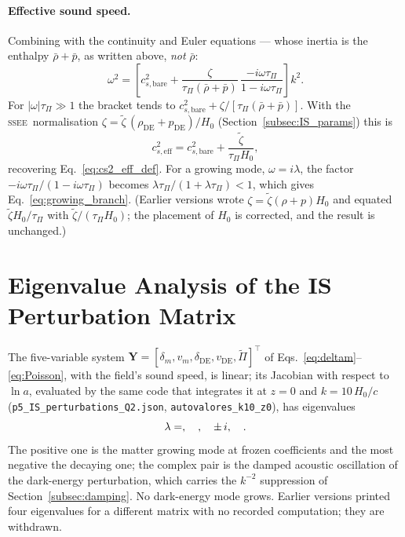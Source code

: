 \documentclass[12pt,a4paper]{article}
\newcommand{\SSEE}{\ifmmode\mathrm{SSEE}\else\textsc{ssee}\fi}
\newcommand{\tauPi}{\tau_\Pi}
\newcommand{\ztilde}{\tilde{\zeta}}
\newcommand{\Pitilde}{\tilde{\Pi}}
\begin{document}
\paragraph{Effective sound speed.}
Combining with the continuity and Euler equations --- whose inertia is the enthalpy
$\bar\rho+\bar p$, as written above, \emph{not} $\bar\rho$:
\begin{equation}
  \omega^2 = \left[c^2_{s,\mathrm{bare}}
    + \frac{\zeta}{\tauPi(\bar\rho+\bar p)}\,\frac{-i\omega\tauPi}{1-i\omega\tauPi}\right]k^2 .
\end{equation}
For $|\omega|\tauPi \gg 1$ the bracket tends to
$c^2_{s,\mathrm{bare}} + \zeta/[\tauPi(\bar\rho+\bar p)]$. With the \SSEE\ normalisation
$\zeta = \ztilde\,(\rho_{\mathrm{DE}}+p_{\mathrm{DE}})/H_0$
(Section~\ref{subsec:IS_params}) this is
\begin{equation}
  c^2_{s,\mathrm{eff}} = c^2_{s,\mathrm{bare}} + \frac{\ztilde}{\tauPi H_0},
\end{equation}
recovering Eq.~\eqref{eq:cs2_eff_def}. For a growing mode, $\omega=i\lambda$, the
factor $-i\omega\tauPi/(1-i\omega\tauPi)$ becomes $\lambda\tauPi/(1+\lambda\tauPi)<1$,
which gives Eq.~\eqref{eq:growing_branch}. (Earlier versions wrote
$\zeta=\ztilde(\rho+p)H_0$ and equated $\ztilde H_0/\tauPi$ with $\ztilde/(\tauPi H_0)$;
the placement of $H_0$ is corrected, and the result is unchanged.)

\section{Eigenvalue Analysis of the IS Perturbation Matrix}
\label{app:eigenvalues}

The five-variable system $\mathbf{Y} = [\delta_m, v_m, \delta_{\mathrm{DE}},
v_{\mathrm{DE}}, \Pitilde]^\top$ of Eqs.~\eqref{eq:deltam}--\eqref{eq:Poisson}, with the
field's sound speed, is linear; its Jacobian with respect to $\ln a$, evaluated by the
same code that integrates it at $z=0$ and $k=10\,H_0/c$
(\texttt{p5\_IS\_perturbations\_Q2.json}, \texttt{autovalores\_k10\_z0}), has
eigenvalues
\begin{equation}
  \lambda = \val{p5_eig0},\quad \val{p5_eig1},\quad
  \val{p5_eig2}\pm\val{p5_eig_im}\,i,\quad \val{p5_eig4}.
\end{equation}
The positive one is the matter growing mode at frozen coefficients and the most
negative the decaying one; the complex pair is the damped acoustic oscillation of the
dark-energy perturbation, which carries the $k^{-2}$ suppression of
Section~\ref{subsec:damping}. No dark-energy mode grows. Earlier versions printed four
eigenvalues for a different matrix with no recorded computation; they are withdrawn.

\clearpage


\end{document}
